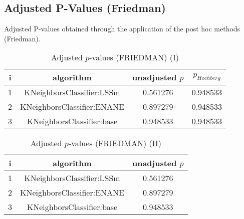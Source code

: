 \documentclass[a4paper,10pt]{article}
\begin{document}
\begin{landscape}
\section{Adjusted P-Values (Friedman)}


Adjusted P-values obtained through the application of the post hoc methods (Friedman).

\begin{table}[!htp]
\centering\small
\begin{tabular}{cccc}
i&algorithm&unadjusted $p$&$p_{Hochberg}$\\
\hline1&KNeighborsClassifier:LSSm&0.561276&0.948533\\2&KNeighborsClassifier:ENANE&0.897279&0.948533\\3&KNeighborsClassifier:base&0.948533&0.948533\\\hline
\end{tabular}
\caption{Adjusted $p$-values (FRIEDMAN) (I)}
\end{table}
\begin{table}[!htp]
\centering\small
\begin{tabular}{ccc}
i&algorithm&unadjusted $p$\\
\hline1&KNeighborsClassifier:LSSm&0.561276\\2&KNeighborsClassifier:ENANE&0.897279\\3&KNeighborsClassifier:base&0.948533\\\hline
\end{tabular}
\caption{Adjusted $p$-values (FRIEDMAN) (II)}
\end{table}

\newpage
\end{landscape}
\end{document}
